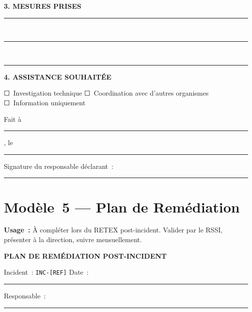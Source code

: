 \textbf{3. MESURES PRISES}

\vspace{1.5ex}
\rule{\linewidth}{0.4pt}\\[1.5ex]
\rule{\linewidth}{0.4pt}\\[1.5ex]
\rule{\linewidth}{0.4pt}

\textbf{4. ASSISTANCE SOUHAITÉE}

☐~Investigation technique \qquad
☐~Coordination avec d'autres organismes \qquad
☐~Information uniquement

\bigskip

Fait à \rule{4cm}{0.4pt}, le \rule{3cm}{0.4pt}

\vspace{2ex}
Signature du responsable déclarant~: \rule{6cm}{0.4pt}

\clearpage

\section{Modèle~5 — Plan de Remédiation}
\label{ann:tpl-remediation}

\begin{boxinfo}
\textbf{Usage~:} À compléter lors du RETEX post-incident.
Valider par le RSSI, présenter à la direction, suivre mensuellement.
\end{boxinfo}

\medskip
\begin{center}
{\large\bfseries\color{CouleurPrimaire}
PLAN DE REMÉDIATION POST-INCIDENT}\\[0.3ex]
{\small Incident~: \texttt{INC-[REF]} \quad Date~: \rule{4cm}{0.4pt}
\quad Responsable~: \rule{4cm}{0.4pt}}
\end{center}

